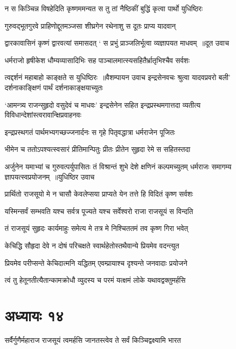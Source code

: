 \twolineshloka
{न स किञ्चिन्न विषहेदिति कृष्णममन्यत}
{स तु तां नैष्ठिकीं बुद्धिं कृत्वा पार्थो युधिष्ठिरः}


\twolineshloka
{गुरुवद्भूतगुरवे प्राहिणोद्दूतमञ्जसा}
{शीघ्रगेन रथेनाशु स दूतः प्राप्य यादवान्}


\twolineshloka
{द्वारकावासिनं कृष्णं द्वारवत्यां समासदत्}
{` स प्रभुं प्राञ्जलिर्भूत्वा व्यज्ञापयत माधवम् ॥दूत उवाच}


\twolineshloka
{धर्मराजो हृषीकेश धौम्यव्यासादिभिः सह}
{पाञ्चालमात्स्यसहितैर्भ्रातृभिश्चैव सर्वशः}


त्वद्दर्शनं महाबाहो काङ्क्षते स युधिष्ठिरः ॥वैशम्पायन उवाच
\twolineshloka
{इन्द्रसेनवचः श्रुत्वा यादवप्रवरो बली'}
{दर्शनाकाङ्क्षिणं पार्थं दर्शनाकाङ्क्षयाच्युतः}


\threelineshloka
{`आमन्त्र्य राजन्सुहृदो वसुदेवं च माधवः'}
{इन्द्रसेनेन सहित इन्द्रप्रस्थमगात्तदा}
{व्यतीत्य विविधान्देशांस्त्वरावान्क्षिप्रवाहनवः}


\twolineshloka
{इन्द्रप्रस्थगतं पार्थमभ्यगच्छज्जनार्दनः}
{स गृहे पितृवद्धात्रा धर्मराजेन पूजितः}


\twolineshloka
{भीमेन च ततोऽपश्यत्स्वसारं प्रीतिमान्पितुः}
{प्रीतः प्रीतेन सुहृदा रेमे स सहितस्तदा}


\threelineshloka
{अर्जुनेन यमाभ्यां च गुरुवत्पर्युपासितः}
{तं विश्रान्तं शुभे देशे क्षणिनं कल्पमच्युतम्}
{धर्मराजः समागम्य ज्ञापयत्स्वप्रयोजनम् ॥युधिष्ठिर उवाच}


\twolineshloka
{प्रार्थितो राजसूयो मे न चासौ केवलेप्सया}
{प्राप्यते येन तत्ते हि विदितं कृष्ण सर्वशः}


\twolineshloka
{यस्मिन्सर्वं सम्भवति यश्च सर्वत्र पूज्यते}
{यश्च सर्वेश्वरो राजा राजसूयं स विन्दति}


\twolineshloka
{तं राजसूयं सुहृदः कार्यमाहुः समेत्य मे}
{तत्र मे निश्चिततमं तव कृष्ण गिरा भवेत्}


\twolineshloka
{केचिद्धि सौहृदा देवे न दोषं परिचक्षते}
{स्वार्थहेतोस्तथैवान्ये प्रियमेव वदन्त्युत}


\twolineshloka
{प्रियमेव परीप्सन्ते केचिदात्मनि यद्धितम्}
{एवम्प्रायाश्च दृश्यन्ते जनवादाः प्रयोजने}


\twolineshloka
{त्वं तु हेतूनतीत्यैतान्कामक्रोधौ व्युदस्य च}
{परमं यत्क्षमं लोके यथावद्वक्तुमर्हसि}


\chapter{अध्यायः १४}
\twolineshloka
{सर्वैर्गुणैर्महाराज राजसूयं त्वमर्हसि}
{जानतस्त्वेव ते सर्वं किञ्चिद्वक्ष्यामि भारत}



